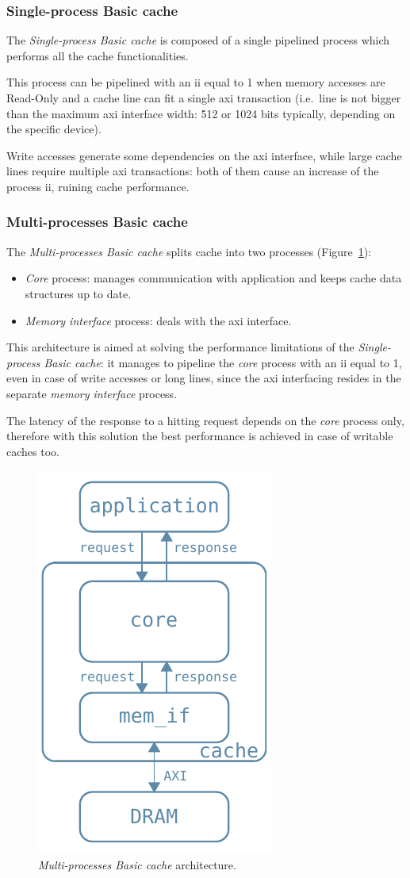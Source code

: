 \documentclass[11pt,a4paper,oneside]{memoir}
\begin{document}
\subsubsection{Single-process Basic cache}
The \emph{Single-process Basic cache} is composed of a single pipelined process
which performs all the cache functionalities.

This process can be pipelined with an \ac{ii} equal to 1 when memory accesses
are Read-Only and a cache line can fit a single \ac{axi} transaction (i.e.\
line is not bigger than the maximum \ac{axi} interface width: 512 or 1024 bits
typically, depending on the specific device).

Write accesses generate some dependencies on the \ac{axi} interface, while large
cache lines require multiple \ac{axi} transactions: both of them cause an
increase of the process \ac{ii}, ruining cache performance.

\subsubsection{Multi-processes Basic cache}
The \emph{Multi-processes Basic cache} splits cache into two processes
(Figure~\ref{fig:multi_proc_basic_arch}):
\begin{itemize}
	\item \emph{Core} process: manages communication with application and
		keeps cache data structures up to date.
	\item \emph{Memory interface} process: deals with the \ac{axi}
		interface.
\end{itemize}

This architecture is aimed at solving the performance limitations of the
\emph{Single-process Basic cache}: it manages to pipeline the \emph{core}
process with an \ac{ii} equal to 1, even in case of write accesses or long
lines, since the \ac{axi} interfacing resides in the separate \emph{memory
interface} process.

The latency of the response to a hitting request depends on the \emph{core}
process only, therefore with this solution the best performance is achieved in case
of writable caches too.

\begin{figure}[!htb]
	\centering
	\includegraphics[width=.3\textwidth]{multi_proc_basic_arch}
	\caption{\emph{Multi-processes Basic cache} architecture.}
	\label{fig:multi_proc_basic_arch}
\end{figure}
\end{document}
